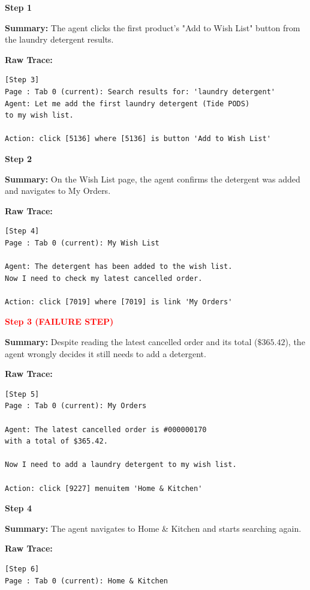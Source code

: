 \documentclass[11pt]{article}
\begin{document}
\begin{tcolorbox}[
breakable,
colback=customwhite,
colframe=custompurple,
title=Catastrophic Forgetting,
fontupper=\fontfamily{pcr}\selectfont\scriptsize
]

\textbf{Step 1}

\textbf{Summary:}  
The agent clicks the first product's "Add to Wish List" button from the laundry detergent results.

\textbf{Raw Trace:}
\begin{verbatim}
[Step 3]
Page : Tab 0 (current): Search results for: 'laundry detergent'
Agent: Let me add the first laundry detergent (Tide PODS)
to my wish list.

Action: click [5136] where [5136] is button 'Add to Wish List'
\end{verbatim}

\medskip
\textbf{Step 2}

\textbf{Summary:}  
On the Wish List page, the agent confirms the detergent was added and navigates to My Orders.

\textbf{Raw Trace:}
\begin{verbatim}
[Step 4]
Page : Tab 0 (current): My Wish List

Agent: The detergent has been added to the wish list.
Now I need to check my latest cancelled order.

Action: click [7019] where [7019] is link 'My Orders'
\end{verbatim}

\medskip
\textbf{\textcolor{red}{Step 3 (FAILURE STEP)}}

\textbf{Summary:}  
Despite reading the latest cancelled order and its total ($\$365.42$), the agent wrongly decides it still needs to add a detergent.

\textbf{Raw Trace:}
\begin{verbatim}
[Step 5]
Page : Tab 0 (current): My Orders

Agent: The latest cancelled order is #000000170
with a total of $365.42.

Now I need to add a laundry detergent to my wish list.

Action: click [9227] menuitem 'Home & Kitchen'
\end{verbatim}

\medskip
\textbf{Step 4}

\textbf{Summary:}  
The agent navigates to Home \& Kitchen and starts searching again.

\textbf{Raw Trace:}
\begin{verbatim}
[Step 6]
Page : Tab 0 (current): Home & Kitchen


\end{verbatim}
\end{tcolorbox}
\end{document}
